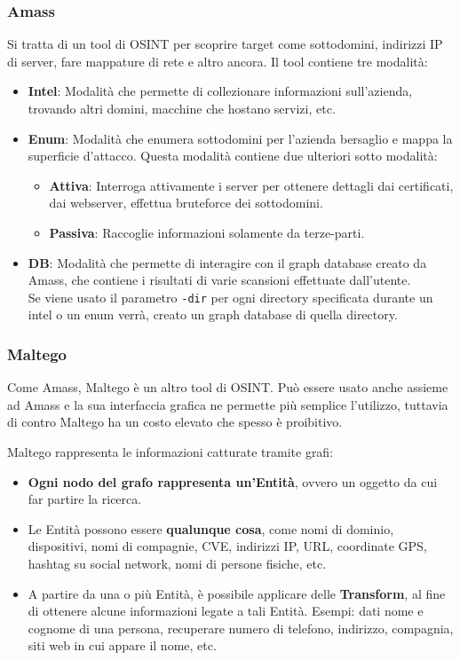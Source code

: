 \documentclass{article}
\begin{document}
\subsubsection{Amass}
Si tratta di un tool di OSINT per scoprire target come sottodomini, indirizzi IP di server, fare mappature di rete e altro ancora. Il tool contiene tre modalità:
\begin{itemize}
    \item \textbf{Intel}: Modalità che permette di collezionare informazioni sull'azienda, trovando altri domini, macchine che hostano servizi, etc.
    \item \textbf{Enum}: Modalità che enumera sottodomini per l'azienda bersaglio e mappa la superficie d'attacco. Questa modalità contiene due ulteriori sotto modalità:
    \begin{itemize}
        \item \textbf{Attiva}: Interroga attivamente i server per ottenere dettagli dai certificati, dai webserver, effettua bruteforce dei sottodomini.
        \item \textbf{Passiva}: Raccoglie informazioni solamente da terze-parti.
    \end{itemize}

    \item \textbf{DB}: Modalità che permette di interagire con il graph database creato da Amass, che contiene i risultati di varie scansioni effettuate dall'utente.\\
    Se viene usato il parametro \verb|-dir| per ogni directory specificata durante un intel o un enum verrà, creato un graph database di quella directory.
\end{itemize}

\subsubsection{Maltego}
Come Amass, Maltego è un altro tool di OSINT. Può essere usato anche assieme ad Amass e la sua interfaccia grafica ne permette più semplice l'utilizzo, tuttavia di contro Maltego ha un costo elevato che spesso è proibitivo.

Maltego rappresenta le informazioni catturate tramite grafi:
\begin{itemize}
    \item \textbf{Ogni nodo del grafo rappresenta un’Entità}, ovvero un oggetto da cui far partire la ricerca.
    \item Le Entità possono essere \textbf{qualunque cosa}, come nomi di dominio, dispositivi, nomi di compagnie, CVE, indirizzi IP, URL, coordinate GPS, hashtag su social network, nomi di persone fisiche, etc.
    \item A partire da una o più Entità, è possibile applicare delle \textbf{Transform}, al fine di ottenere alcune informazioni legate a tali Entità. Esempi: dati nome e cognome di una persona, recuperare numero di telefono, indirizzo, compagnia, siti web in cui appare il nome, etc.
\end{itemize}
\end{document}

